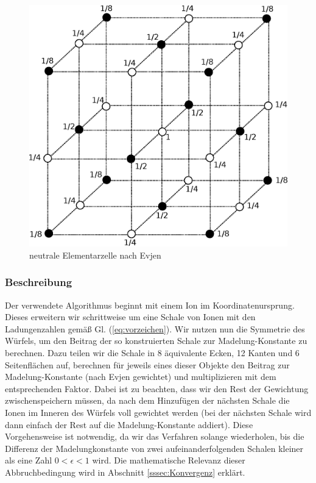 \documentclass[10pt,a4paper]{article}
\begin{document}
\begin{figure}[h]
	\centering
	\includegraphics[scale = 0.35]{./figures/wuerfel.eps}
	\caption{neutrale Elementarzelle nach Evjen}
	\label{skalierungsgrafik3d}
\end{figure}

\subsubsection{Beschreibung}

Der verwendete Algorithmus beginnt mit einem Ion im Koordinatenursprung. Dieses
erweitern wir schrittweise um eine Schale von Ionen mit den Ladungenzahlen gemäß
Gl. (\ref{eq:vorzeichen}). Wir nutzen nun die Symmetrie des Würfels, um den Beitrag
der so konstruierten Schale zur Madelung-Konstante zu berechnen. Dazu teilen wir die
Schale in 8 äquivalente Ecken, 12 Kanten und 6 Seitenflächen auf, berechnen für
jeweils eines dieser Objekte den Beitrag zur Madelung-Konstante (nach Evjen gewichtet)
und multiplizieren mit dem entsprechenden Faktor. Dabei ist zu beachten, dass wir
den Rest der Gewichtung zwischenspeichern müssen, da nach dem Hinzufügen der nächsten
Schale die Ionen im Inneren des Würfels voll gewichtet werden (bei der nächsten Schale
wird dann einfach der Rest auf die Madelung-Konstante addiert). Diese Vorgehensweise ist notwendig, da wir das Verfahren solange wiederholen, bis die Differenz der Madelungkonstante
von zwei aufeinanderfolgenden Schalen kleiner als eine Zahl $0 < \epsilon < 1$ wird. Die
mathematische Relevanz dieser Abbruchbedingung wird in Abschnitt \ref{sssec:Konvergenz}
erklärt.
\end{document}
